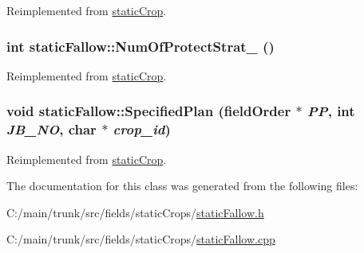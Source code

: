 Reimplemented from \hyperlink{classstatic_crop_a32b69ed138beaed150efa74d18e82d8e}{staticCrop}.\hypertarget{classstatic_fallow_a76bf31d045ba244e30de88a7c248d1e4}{
\subsubsection[{NumOfProtectStrat\_\-}]{\setlength{\rightskip}{0pt plus 5cm}int staticFallow::NumOfProtectStrat\_\- ()}}
\label{classstatic_fallow_a76bf31d045ba244e30de88a7c248d1e4}


Reimplemented from \hyperlink{classstatic_crop_a4d3d767f569f48eb68ffa76822302467}{staticCrop}.\hypertarget{classstatic_fallow_a26c900c35a0962d6779bdb87e8c1aa98}{
\subsubsection[{SpecifiedPlan}]{\setlength{\rightskip}{0pt plus 5cm}void staticFallow::SpecifiedPlan ({\bf fieldOrder} $\ast$ {\em PP}, \/  int {\em JB\_\-NO}, \/  char $\ast$ {\em crop\_\-id})}}
\label{classstatic_fallow_a26c900c35a0962d6779bdb87e8c1aa98}


Reimplemented from \hyperlink{classstatic_crop_af19d8a1e4f4833325f6712c22ede8b45}{staticCrop}.

The documentation for this class was generated from the following files:\begin{DoxyCompactItemize}
\item 
C:/main/trunk/src/fields/staticCrops/\hyperlink{static_fallow_8h}{staticFallow.h}\item 
C:/main/trunk/src/fields/staticCrops/\hyperlink{static_fallow_8cpp}{staticFallow.cpp}\end{DoxyCompactItemize}
